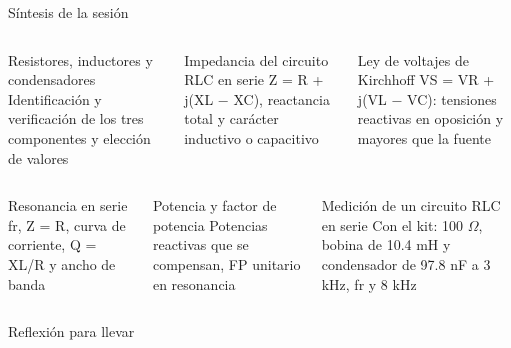 \documentclass[aspectratio=169,11pt,xcolor={table}]{beamer}
\begin{document}
\begin{frame}{Síntesis de la sesión}
\begin{columns}[T,onlytextwidth]
\begin{cardB}{Resistores, inductores y condensadores}
\scriptsize Identificación y verificación de los tres componentes y elección de valores
\end{cardB}
\begin{cardO}{Impedancia del circuito RLC en serie}
\scriptsize Z = R + j(XL \ensuremath{-} XC), reactancia total y carácter inductivo o capacitivo
\end{cardO}
\begin{cardG}{Ley de voltajes de Kirchhoff}
\scriptsize VS = VR + j(VL \ensuremath{-} VC): tensiones reactivas en oposición y mayores que la fuente
\end{cardG}
\end{columns}
\vspace{2mm}
\begin{columns}[T,onlytextwidth]
\begin{cardB}{Resonancia en serie}
\scriptsize fr, Z = R, curva de corriente, Q = XL/R y ancho de banda
\end{cardB}
\begin{cardO}{Potencia y factor de potencia}
\scriptsize Potencias reactivas que se compensan, FP unitario en resonancia
\end{cardO}
\begin{cardG}{Medición de un circuito RLC en serie}
\scriptsize Con el kit: 100 \ensuremath{\Omega}, bobina de 10.4 mH y condensador de 97.8 nF a 3 kHz, fr y 8 kHz
\end{cardG}
\end{columns}
\end{frame}

\begin{frame}{Reflexión para llevar}
\centering
{}
\end{frame}
\end{document}
